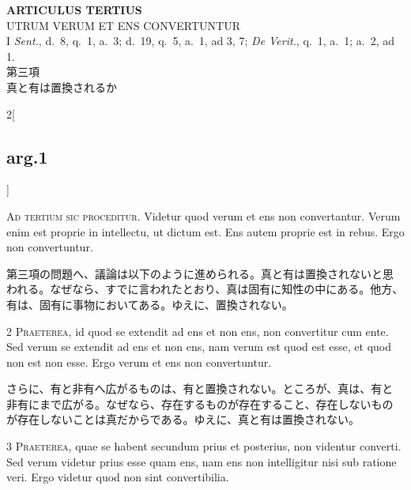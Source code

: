 \documentclass[paper=a4paper,fontsize=10pt,jafontsize=9pt,titlepage]{jlreq}
\begin{document}
{}
\setcounter{section}{3}
\setcounter{subsection}{0}
\begin{center}
 {\Large {\bfseries ARTICULUS TERTIUS}}\\
 {\large UTRUM VERUM ET ENS CONVERTUNTUR}\\
 {\footnotesize I {\itshape Sent.}, d.~8, q.~1, a.~3; d.~19, q.~5, a.~1,
 ad 3, 7; {\itshape De Verit.}, q.~1, a.~1; a.~2, ad 1.}\\
 {\Large 第三項\\真と有は置換されるか}
\end{center}

\begin{paracol}{2}[\subsection{arg.1}]


{\huge A}{\scshape d tertium sic proceditur}. Videtur quod verum et
ens non convertantur. Verum enim est proprie in intellectu, ut dictum
est. Ens autem proprie est in rebus. Ergo non convertuntur.

\switchcolumn

第三項の問題へ、議論は以下のように進められる。真と有は置換されないと思
われる。なぜなら、すでに言われたとおり、真は固有に知性の中にある。他方、
有は、固有に事物においてある。ゆえに、置換されない。



{\scshape 2 Praeterea}, id quod se extendit ad ens et non ens, non
 convertitur cum ente. Sed verum se extendit ad ens et non ens, nam
 verum est quod est esse, et quod non est non esse. Ergo verum et ens
 non convertuntur.

\switchcolumn

さらに、有と非有へ広がるものは、有と置換されない。ところが、真は、有と
非有にまで広がる。なぜなら、存在するものが存在すること、存在しないもの
が存在しないことは真だからである。ゆえに、真と有は置換されない。



{\scshape 3 Praeterea}, quae se habent secundum prius et posterius,
 non videntur converti. Sed verum videtur prius esse quam ens, nam ens
 non intelligitur nisi sub ratione veri. Ergo videtur quod non sint
 convertibilia.


\end{paracol}
\end{document}
